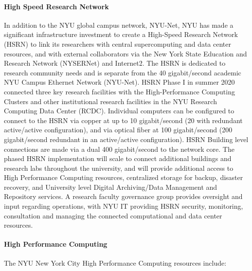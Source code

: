 \paragraph{High Speed Research Network}
In addition to the NYU global campus network, NYU-Net, NYU has made a significant infrastructure investment to create a High-Speed Research Network (HSRN) to link its researchers with central supercomputing and data center resources, and with external collaborators via the New York State Education and Research Network (NYSERNet) and Internet2. The HSRN is dedicated to research community needs and is separate from the 40 gigabit/second academic NYU Campus Ethernet Network (NYU-Net). HSRN Phase I in summer 2020 connected three key research facilities with the High-Performance Computing Clusters and other institutional research facilities in the NYU Research Computing Data Center (RCDC). Individual computers can be configured to connect to the HSRN via copper at up to 10 gigabit/second (20 with redundant active/active configuration), and via optical fiber at 100 gigabit/second (200 gigabit/second redundant in an active/active configuration). HSRN Building level connections are made via a dual 400 gigabit/second to the network core. The phased HSRN implementation will scale to connect additional buildings and research labs throughout the university, and will provide additional access to High Performance Computing resources, centralized storage for backup, disaster recovery, and University level Digital Archiving/Data Management and Repository services. A research faculty governance group provides oversight and input regarding operations, with NYU IT providing HSRN security, monitoring, consultation and managing the connected computational and data center resources.


\paragraph{High Performance Computing}
The NYU New York City High Performance Computing resources include:

